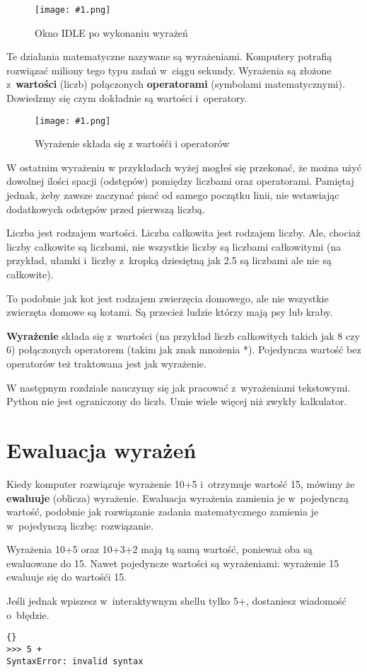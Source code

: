 \documentclass{book}
\newcommand{\img}[3]{
\begin{figure}
\centerline{
	\texttt{[image: \#1.png]}
}
\caption{#2}
\label{#1}
\end{figure}
}
\begin{document}
\img{idle-wyrazenia}{Okno IDLE po wykonaniu wyrażeń}{7cm}

Te działania matematyczne nazywane są wyrażeniami. Komputery potrafią rozwiązać miliony tego typu zadań w~ciągu sekundy. Wyrażenia są złożone z~{\bf wartości} (liczb) połączonych {\bf operatorami} (symbolami matematycznymi). Dowiedzmy się czym dokładnie są wartości i~operatory.

\img{idle-wyroperwart}{Wyrażenie składa się z wartośći i operatorów}{3cm}

W ostatnim wyrażeniu w przykładach wyżej mogłeś się przekonać, że można użyć dowolnej ilości spacji (odstępów) pomiędzy liczbami oraz operatorami. Pamiętaj jednak, żeby zawsze zaczynać pisać od samego początku linii, nie wstawiając dodatkowych odstępów przed pierwszą liczbą.

Liczba jest rodzajem wartości. Liczba całkowita jest rodzajem liczby. Ale, chociaż liczby całkowite są liczbami, nie wszystkie liczby są liczbami całkowitymi (na przykład, ułamki i~liczby z~kropką dziesiętną jak 2.5 są liczbami ale nie są całkowite).

To podobnie jak kot jest rodzajem zwierzęcia domowego, ale nie wszystkie zwierzęta domowe są kotami. Są przecież ludzie którzy mają psy lub kraby. 

{\bf Wyrażenie} składa się z~wartości (na przykład liczb całkowitych takich jak 8 czy 6) połączonych operatorem (takim jak znak mnożenia *). Pojedyncza wartość bez operatorów też traktowana jest jak wyrażenie.

W następnym rozdziale nauczymy się jak pracować z~wyrażeniami tekstowymi. Python nie jest ograniczony do liczb. Umie wiele więcej niż zwykły kalkulator.

\section{Ewaluacja wyrażeń}

Kiedy komputer rozwiązuje wyrażenie 10+5 i~otrzymuje wartość 15, mówimy że {\bf ewaluuje} (oblicza) wyrażenie. Ewaluacja wyrażenia zamienia je w~pojedynczą wartość, podobnie jak rozwiązanie zadania matematycznego zamienia je w~pojedynczą liczbę: rozwiązanie.

Wyrażenia 10+5 oraz 10+3+2 mają tą samą wartość, ponieważ oba są ewaluowane do 15. Nawet pojedyncze wartości są wyrażeniami: wyrażenie 15 ewaluuje się do wartośći 15.

Jeśli jednak wpiszesz w~interaktywnym shellu tylko 5+, dostaniesz wiadomość o~błędzie.
\lstset{language=python}
\begin{lstlisting}{}
>>> 5 +
SyntaxError: invalid syntax
\end{lstlisting}
\end{document}
